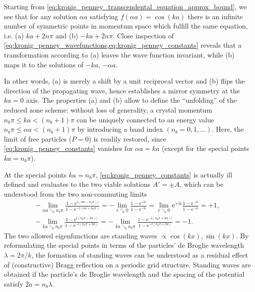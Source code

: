 \documentclass{svmono}
\def\ri{\mathrm i}
\def\re{\mathrm e}
\begin{document}
Starting from \cref{eq:kronig_penney_transcendental_equation_approx_bound}, we see that for any solution $\alpha a$ satisfying $f(\alpha a)=\cos(k a)$ there is an infinite number of symmetric points in momentum space which fulfill the same equation, i.e. (a) $ka + 2n\pi$ and (b) $-ka+2n\pi$.
Close inspection of \cref{eq:kronig_penney_wavefunctions,eq:kronig_penney_constants} reveals that a transformation according to (a) leaves the wave function invariant, while (b) maps it to the solutions of $-ka$, $-\alpha a$.

In other words, (a) is merely a shift by a unit reciprocal vector and (b) flips the direction of the propagating wave, hence establishes a mirror symmetry at the $ka=0$ axis.
The properties (a) and (b) allow to define the ``unfolding'' of the reduced zone scheme:
without loss of generality, a crystal momentum $n_b\pi\leq ka<(n_b+1)\pi$ can be uniquely connected to an energy value $n_b\pi\leq \alpha a<(n_b+1)\pi$ by introducing a band index $(n_b=0,1,\dots)$.
Here, the limit of free particles ($P=0$) is readily restored, since \cref{eq:kronig_penney_constants} vanishes for $\alpha a = ka$ (except for the special points $ka=n_b\pi$).

At the special points $ka=n_b\pi$, \cref{eq:kronig_penney_constants} is actually ill defined and evaluates to the two viable solutions $A'=\pm A$, which can be understood from the two non-commuting limits
\begin{align}
    -\lim_{\alpha a \searrow n_b\pi}\frac{1-\re^{\ri(\alpha a-n_b\pi))}}{1-\re^{-\ri(\alpha a+n_b\pi)}}
    =
    -\lim_{\epsilon\searrow0}\frac{1-\re^{+\ri\epsilon}}{1-\re^{-\ri\epsilon}}
    =
    \lim_{\epsilon\searrow0}\re^{+\ri\epsilon}\frac{1-\re^{-\ri\epsilon}}{1-\re^{-\ri\epsilon}}
    =
    +1,
    \\
    -\lim_{k a \searrow n_b\pi}\frac{1-\re^{\ri(n_b\pi - ka))}}{1-\re^{-\ri(n_b\pi+ka)}}
    =
    -\lim_{k a \searrow n_b\pi}\frac{1-\re^{-\ri(n_b\pi + ka))}}{1-\re^{-\ri(n_b\pi+ka)}}
    =
    -1.
\end{align}
The two allowed eigenfunctions are standing waves $\propto \cos(kx),\sin(kx)$.
By reformulating the special points in terms of the particles' de Broglie wavelength $\lambda=2\pi/k$, the formation of standing waves can be understood as a residual effect of (constructive) Bragg reflection on a periodic grid structure.
Standing waves are obtained if the particle's de Broglie wavelength and the spacing of the potential satisfy $2a=n_b\lambda$.
\end{document}
